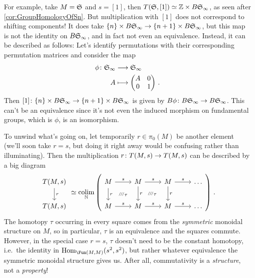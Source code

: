 For example, take $M=\mathfrak{S}$ and $s=[1]$, then $T(\mathfrak{S},[1])\simeq \mathbb{Z}\times B\mathfrak{S}_\infty$, as seen after \cref{cor:GroupHomologyOfSn}. But multiplication with $[1]$ does not correspond to shifting components! It does take $\{n\}\times B\SS_\infty\morphism \{n+1\}\times B\SS_\infty$, but this map is not the identity on $B\mathfrak{S}_\infty$, and in fact not even an equivalence. Instead, it can be described as follows: Let's identify permutations with their corresponding permutation matrices and consider the map
\begin{align*}
	\phi\colon \SS_\infty&\morphism \SS_\infty\\
	A & \longmapsto \begin{pmatrix}
		A & 0\\
		0 & 1
	\end{pmatrix}\,.
\end{align*}
Then $[1]\colon \{n\}\times B\SS_\infty\morphism\{n+1\}\times B\SS_\infty$ is given by $B\phi\colon B\SS_\infty\morphism B\SS_\infty$. This can't be an equivalence since it's not even the induced morphism on fundamental groups, which is $\phi$, is an isomorphism.

To unwind what's going on, let temporarily $r\in \pi_0(M)$ be another element (we'll soon take $r=s$, but doing it right away would be confusing rather than illuminating). Then the multiplication $r\colon T(M,s)\morphism T(M,s)$ can be described by a big diagram
\begin{equation*}
	\begin{tikzcd}
		T(M,s)\dar["r"]\\
		T(M,s)
	\end{tikzcd}\simeq\colimit_\IN\left(\begin{tikzcd}
		M\vphantom{T(M,s)}\dar["r"]\rar["s"]\drar[phantom,"{\scriptscriptstyle /\!/\!/}_\tau"] & M\dar["r"] \rar["s"]\drar[phantom,"{\scriptscriptstyle /\!/\!/}_\tau"] & M\rar["s"]\dar["r"] & \dotso\\
		M\vphantom{T(M,s)}\rar["s"] & M\rar["s"] & M\rar["s"] & \dotso
	\end{tikzcd}\right)\,.
\end{equation*}
The homotopy $\tau$ occurring in every square comes from the \emph{symmetric} monoidal structure on $M$, so in particular, $\tau$ is an equivalence and the squares commute. However, in the special case $r=s$, $\tau$ doesn't need to be the constant homotopy, i.e.\ the identity in $\Hom_{\Fun(M,M)}(s^2,s^2)$, but rather whatever equivalence the symmetric monoidal structure gives us. After all, commutativity is a \emph{structure}, not a \emph{property}!

